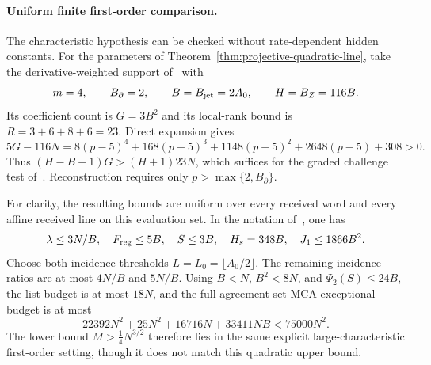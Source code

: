 \paragraph{Uniform finite first-order comparison.}
The characteristic hypothesis can be checked without rate-dependent
hidden constants. For the parameters of
Theorem~\ref{thm:projective-quadratic-line}, take the derivative-weighted
support of~\cite[Eq.~(60)]{dkt2026} with
\[
 m=4,\qquad B_\partial=2,\qquad B=B_{\rm jet}=2A_0,
 \qquad H=B_Z=116B.
\]
Its coefficient count is $G=3B^2$ and its local-rank bound is
$R=3+6+8+6=23$. Direct expansion gives
\[
 5G-116N=8(p-5)^4+168(p-5)^3+1148(p-5)^2+2648(p-5)+308>0.
\]
Thus $(H-B+1)G>(H+1)23N$, which suffices for the graded challenge
test of~\cite[Proposition~5.10]{dkt2026}. Reconstruction requires only
$p>\max\{2,B_\partial\}$.

For clarity, the resulting bounds are uniform over every received word
and every affine received line on this evaluation set. In the notation
of~\cite[Lemma~5.6]{dkt2026}, one has
\[
 \lambda\le3N/B,\quad F_{\rm reg}\le5B,\quad
 S\le3B,\quad H_s=348B,\quad J_1\le1866B^2.
\]
Choose both incidence thresholds $L=L_0=\lfloor A_0/2\rfloor$.
The remaining incidence ratios are at most $4N/B$ and $5N/B$.
Using $B<N$, $B^2<8N$, and $\Psi_2(S)\le24B$, the list budget is
at most $18N$, and the full-agreement-set MCA exceptional budget is
at most
\[
 22392N^2+25N^2+16716N+33411NB<75000N^2.
\]
The lower bound $M>\tfrac14N^{3/2}$ therefore lies in the same
explicit large-characteristic first-order setting, though it does not
match this quadratic upper bound.
